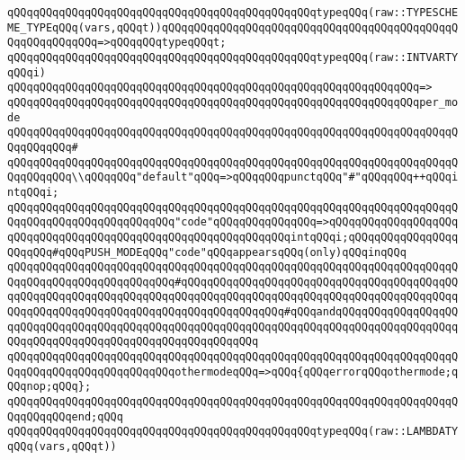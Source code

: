 \verb|qQQqqQQqqQQqqQQqqQQqqQQqqQQqqQQqqQQqqQQqqQQqqQQqtypeqQQq(raw::TYPESCHEME_TYPEqQQq(vars,qQQqt))qQQqqQQqqQQqqQQqqQQqqQQqqQQqqQQqqQQqqQQqqQQqqQQqqQQqqQQqqQQq=>qQQqqQQqtypeqQQqt;|\newline
\newline
\verb|qQQqqQQqqQQqqQQqqQQqqQQqqQQqqQQqqQQqqQQqqQQqqQQqtypeqQQq(raw::INTVARTYqQQqi)|\newline
\verb|qQQqqQQqqQQqqQQqqQQqqQQqqQQqqQQqqQQqqQQqqQQqqQQqqQQqqQQqqQQqqQQq=>|\newline
\verb|qQQqqQQqqQQqqQQqqQQqqQQqqQQqqQQqqQQqqQQqqQQqqQQqqQQqqQQqqQQqqQQqper_mode|\newline
\verb|qQQqqQQqqQQqqQQqqQQqqQQqqQQqqQQqqQQqqQQqqQQqqQQqqQQqqQQqqQQqqQQqqQQqqQQqqQQqqQQq#|\newline
\verb|qQQqqQQqqQQqqQQqqQQqqQQqqQQqqQQqqQQqqQQqqQQqqQQqqQQqqQQqqQQqqQQqqQQqqQQqqQQqqQQq\\qQQqqQQq"default"qQQq=>qQQqqQQqpunctqQQq"#"qQQqqQQq++qQQqintqQQqi;|\newline
\verb|qQQqqQQqqQQqqQQqqQQqqQQqqQQqqQQqqQQqqQQqqQQqqQQqqQQqqQQqqQQqqQQqqQQqqQQqqQQqqQQqqQQqqQQqqQQqqQQq"code"qQQqqQQqqQQqqQQq=>qQQqqQQqqQQqqQQqqQQqqQQqqQQqqQQqqQQqqQQqqQQqqQQqqQQqqQQqqQQqqQQqintqQQqi;qQQqqQQqqQQqqQQqqQQqqQQq#qQQqPUSH_MODEqQQq"code"qQQqappearsqQQq(only)qQQqinqQQq|\newline
\verb|qQQqqQQqqQQqqQQqqQQqqQQqqQQqqQQqqQQqqQQqqQQqqQQqqQQqqQQqqQQqqQQqqQQqqQQqqQQqqQQqqQQqqQQqqQQqqQQq#qQQqqQQqqQQqqQQqqQQqqQQqqQQqqQQqqQQqqQQqqQQqqQQqqQQqqQQqqQQqqQQqqQQqqQQqqQQqqQQqqQQqqQQqqQQqqQQqqQQqqQQqqQQqqQQqqQQqqQQqqQQqqQQqqQQqqQQqqQQqqQQqqQQqqQQqqQQq#qQQqandqQQqqQQqqQQqqQQqqQQqqQQqqQQqqQQqqQQqqQQqqQQqqQQqqQQqqQQqqQQqqQQqqQQqqQQqqQQqqQQqqQQqqQQqqQQqqQQqqQQqqQQqqQQqqQQqqQQqqQQqqQQqqQQq|\newline
\verb|qQQqqQQqqQQqqQQqqQQqqQQqqQQqqQQqqQQqqQQqqQQqqQQqqQQqqQQqqQQqqQQqqQQqqQQqqQQqqQQqqQQqqQQqqQQqqQQqothermodeqQQq=>qQQq{qQQqerrorqQQqothermode;qQQqnop;qQQq};|\newline
\verb|qQQqqQQqqQQqqQQqqQQqqQQqqQQqqQQqqQQqqQQqqQQqqQQqqQQqqQQqqQQqqQQqqQQqqQQqqQQqqQQqend;qQQq|\newline
\newline
\verb|qQQqqQQqqQQqqQQqqQQqqQQqqQQqqQQqqQQqqQQqqQQqqQQqtypeqQQq(raw::LAMBDATYqQQq(vars,qQQqt))|\newline
